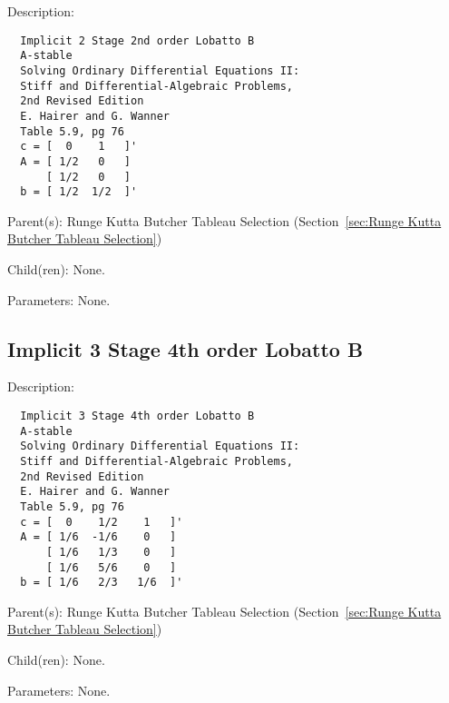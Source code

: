 \begin{list}{}
  {\setlength{\leftmargin}{1.0in}
   \setlength{\labelwidth}{0.75in}
   \setlength{\labelsep}{0.125in}}
  \item[Description:]
\begin{verbatim}
  Implicit 2 Stage 2nd order Lobatto B
  A-stable
  Solving Ordinary Differential Equations II:
  Stiff and Differential-Algebraic Problems,
  2nd Revised Edition
  E. Hairer and G. Wanner
  Table 5.9, pg 76
  c = [  0    1   ]'
  A = [ 1/2   0   ]
      [ 1/2   0   ]
  b = [ 1/2  1/2  ]'
\end{verbatim}
  \item[Parent(s):]
    Runge Kutta Butcher Tableau Selection (Section~\ref{sec:Runge Kutta Butcher Tableau Selection})
  \item[Child(ren):]
    None. 
  \item[Parameters:]
    None. 
\end{list}

\subsection{Implicit 3 Stage 4th order Lobatto B}
\label{sec:Implicit 3 Stage 4th order Lobatto B}

\begin{list}{}
  {\setlength{\leftmargin}{1.0in}
   \setlength{\labelwidth}{0.75in}
   \setlength{\labelsep}{0.125in}}
  \item[Description:]
\begin{verbatim}
  Implicit 3 Stage 4th order Lobatto B
  A-stable
  Solving Ordinary Differential Equations II:
  Stiff and Differential-Algebraic Problems,
  2nd Revised Edition
  E. Hairer and G. Wanner
  Table 5.9, pg 76
  c = [  0    1/2    1   ]'
  A = [ 1/6  -1/6    0   ]
      [ 1/6   1/3    0   ]
      [ 1/6   5/6    0   ]
  b = [ 1/6   2/3   1/6  ]'
\end{verbatim}
  \item[Parent(s):]
    Runge Kutta Butcher Tableau Selection (Section~\ref{sec:Runge Kutta Butcher Tableau Selection})
  \item[Child(ren):]
    None. 
  \item[Parameters:]
    None. 
\end{list}


